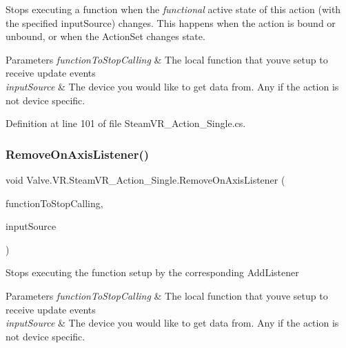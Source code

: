 Stops executing a function when the {\itshape functional} active state of this action (with the specified input\+Source) changes. This happens when the action is bound or unbound, or when the Action\+Set changes state. 


\begin{DoxyParams}{Parameters}
{\em function\+To\+Stop\+Calling} & The local function that you\textquotesingle{}ve setup to receive update events\\
\hline
{\em input\+Source} & The device you would like to get data from. Any if the action is not device specific.\\
\hline
\end{DoxyParams}


Definition at line 101 of file Steam\+V\+R\+\_\+\+Action\+\_\+\+Single.\+cs.

\mbox{\label{class_valve_1_1_v_r_1_1_steam_v_r___action___single_a39aed374b5f84383e67dd25b592ac48e}} 
\subsubsection{\texorpdfstring{RemoveOnAxisListener()}{RemoveOnAxisListener()}}
{\footnotesize\ttfamily void Valve.\+V\+R.\+Steam\+V\+R\+\_\+\+Action\+\_\+\+Single.\+Remove\+On\+Axis\+Listener (\begin{DoxyParamCaption}\item[{\mbox{\hyperlink{class_valve_1_1_v_r_1_1_steam_v_r___action___single_a4193937cd6b6e4b7248374bc5636f6fd}{Axis\+Handler}}}]{function\+To\+Stop\+Calling,  }\item[{\mbox{\hyperlink{namespace_valve_1_1_v_r_a82e5bf501cc3aa155444ee3f0662853f}{Steam\+V\+R\+\_\+\+Input\+\_\+\+Sources}}}]{input\+Source }\end{DoxyParamCaption})}



Stops executing the function setup by the corresponding Add\+Listener 


\begin{DoxyParams}{Parameters}
{\em function\+To\+Stop\+Calling} & The local function that you\textquotesingle{}ve setup to receive update events\\
\hline
{\em input\+Source} & The device you would like to get data from. Any if the action is not device specific.\\
\hline
\end{DoxyParams}


